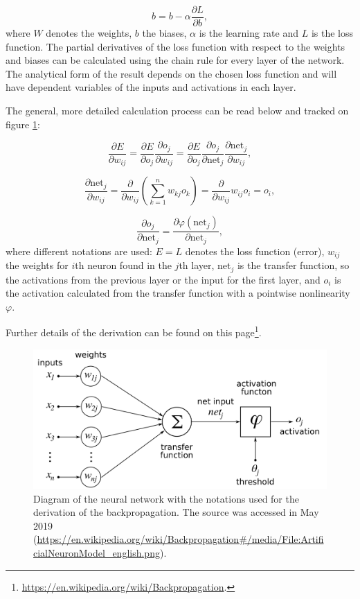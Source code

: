 \documentclass[12pt]{article}
\theoremstyle{plain}
\begin{document}
\begin{equation}
b = b - \alpha \frac{ \partial L}{ \partial b},
\end{equation}
where $W$ denotes the weights, $b$ the biases, $\alpha$ is the learning rate and $L$ is the loss function. The partial derivatives of the loss function with respect to the weights and biases can be calculated using the chain rule for every layer of the network. The analytical form of the result depends on the chosen loss function and will have dependent variables of the inputs and activations in each layer. 

The general, more detailed calculation process can be read below and tracked on figure \ref{backprop_fig}:

\begin{equation}
\frac{\partial E}{\partial w_{ij}} = \frac{\partial E}{\partial o_{j}} \frac{\partial o_{j}}{\partial w_{ij}}
= \frac{\partial E}{\partial o_j} \frac{\partial o_j}{\partial\text{net}_j} \frac{\partial \text{net}_j}{\partial w_{ij}},
\end{equation}


\begin{equation}
\frac{\partial \text{net}_j}{\partial w_{ij}} = \frac{\partial}{\partial w_{ij}} \left(\sum_{k=1}^n w_{kj} o_k\right) = \frac{\partial}{\partial w_{ij}}  w_{ij} o_i= o_i,
\end{equation}

\begin{equation}
\frac{\partial o_j}{\partial\text{net}_j} = \frac {\partial  \varphi(\text{net}_j)}{\partial \text{net}_j},
\end{equation}
where different notations are used: $E=L$ denotes the loss function (error), $w_{ij}$ the weights for $i$th neuron found in the $j$th layer, net$_j$ is the transfer function, so the activations from the previous layer or the input for the first layer, and $o_i$ is the activation calculated from the transfer function with a pointwise nonlinearity $\varphi$. 

Further details of the derivation can be found on this page\footnote{\url{https://en.wikipedia.org/wiki/Backpropagation}.}.

\begin{figure}[h!]
    \centering
	\includegraphics[width=.9\linewidth]{media/ArtificialNeuronModel_english.png}
	\caption{Diagram of the neural network with the notations used for the derivation of the backpropagation. The source was accessed in May 2019 (\url{https://en.wikipedia.org/wiki/Backpropagation\#/media/File:ArtificialNeuronModel_english.png}).}
	\label{backprop_fig}
\end{figure}
\end{document}
